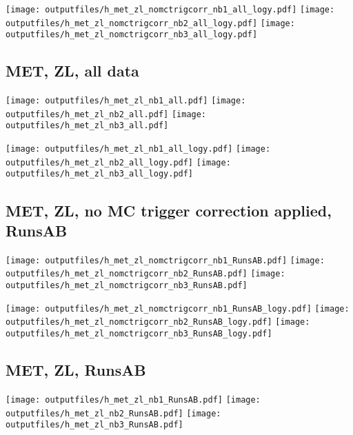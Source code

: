 \documentclass[11pt]{article}
\begin{document}
    \noindent
     \texttt{[image: outputfiles/h\_met\_zl\_nomctrigcorr\_nb1\_all\_logy.pdf]}
     \texttt{[image: outputfiles/h\_met\_zl\_nomctrigcorr\_nb2\_all\_logy.pdf]}
     \texttt{[image: outputfiles/h\_met\_zl\_nomctrigcorr\_nb3\_all\_logy.pdf]}


     \subsection{ MET, ZL, all data}

    \noindent
     \texttt{[image: outputfiles/h\_met\_zl\_nb1\_all.pdf]}
     \texttt{[image: outputfiles/h\_met\_zl\_nb2\_all.pdf]}
     \texttt{[image: outputfiles/h\_met\_zl\_nb3\_all.pdf]}

    \noindent
     \texttt{[image: outputfiles/h\_met\_zl\_nb1\_all\_logy.pdf]}
     \texttt{[image: outputfiles/h\_met\_zl\_nb2\_all\_logy.pdf]}
     \texttt{[image: outputfiles/h\_met\_zl\_nb3\_all\_logy.pdf]}




     \subsection{ MET, ZL, no MC trigger correction applied, RunsAB}

    \noindent
     \texttt{[image: outputfiles/h\_met\_zl\_nomctrigcorr\_nb1\_RunsAB.pdf]}
     \texttt{[image: outputfiles/h\_met\_zl\_nomctrigcorr\_nb2\_RunsAB.pdf]}
     \texttt{[image: outputfiles/h\_met\_zl\_nomctrigcorr\_nb3\_RunsAB.pdf]}

    \noindent
     \texttt{[image: outputfiles/h\_met\_zl\_nomctrigcorr\_nb1\_RunsAB\_logy.pdf]}
     \texttt{[image: outputfiles/h\_met\_zl\_nomctrigcorr\_nb2\_RunsAB\_logy.pdf]}
     \texttt{[image: outputfiles/h\_met\_zl\_nomctrigcorr\_nb3\_RunsAB\_logy.pdf]}


     \subsection{ MET, ZL, RunsAB}

    \noindent
     \texttt{[image: outputfiles/h\_met\_zl\_nb1\_RunsAB.pdf]}
     \texttt{[image: outputfiles/h\_met\_zl\_nb2\_RunsAB.pdf]}
     \texttt{[image: outputfiles/h\_met\_zl\_nb3\_RunsAB.pdf]}
\end{document}
